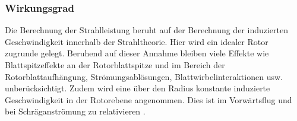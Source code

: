 \subsubsection{Wirkungsgrad}
Die Berechnung der Strahlleistung beruht auf der Berechnung der induzierten Geschwindigkeit innerhalb der Strahltheorie. Hier wird ein idealer Rotor zugrunde gelegt.
Beruhend auf dieser Annahme bleiben viele Effekte wie Blattspitzeffekte an der Rotorblattspitze und im Bereich der Rotorblattaufhängung, Strömungsablösungen, Blattwirbelinteraktionen usw. unberücksichtigt.  Zudem wird eine über den Radius konstante induzierte Geschwindigkeit in der Rotorebene angenommen. Dies ist im Vorwärtsflug und bei Schräganströmung zu relativieren \cite{Wall.2015}.
